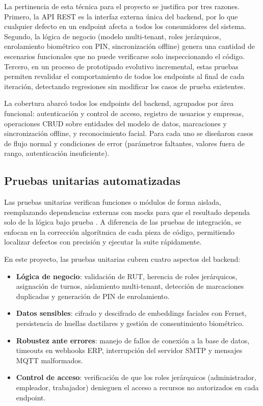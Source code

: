 \documentclass{iccmemoria}
\begin{document}
La pertinencia de esta técnica para el proyecto se justifica por tres razones. Primero, la API REST es la interfaz externa única del backend, por lo que cualquier defecto en un endpoint afecta a todos los consumidores del sistema. Segundo, la lógica de negocio (modelo multi-tenant, roles jerárquicos, enrolamiento biométrico con PIN, sincronización offline) genera una cantidad de escenarios funcionales que no puede verificarse solo inspeccionando el código. Tercero, en un proceso de prototipado evolutivo incremental, estas pruebas permiten revalidar el comportamiento de todos los endpoints al final de cada iteración, detectando regresiones sin modificar los casos de prueba existentes.

La cobertura abarcó todos los endpoints del backend, agrupados por área funcional: autenticación y control de acceso, registro de usuarios y empresas, operaciones CRUD sobre entidades del modelo de datos, marcaciones y sincronización offline, y reconocimiento facial. Para cada uno se diseñaron casos de flujo normal y condiciones de error (parámetros faltantes, valores fuera de rango, autenticación insuficiente).

\subsection{Pruebas unitarias automatizadas}
Las pruebas unitarias verifican funciones o módulos de forma aislada, reemplazando dependencias externas con mocks para que el resultado dependa solo de la lógica bajo prueba \cite{okken2021}. A diferencia de las pruebas de integración, se enfocan en la corrección algorítmica de cada pieza de código, permitiendo localizar defectos con precisión y ejecutar la suite rápidamente.

En este proyecto, las pruebas unitarias cubren cuatro aspectos del backend:
\begin{itemize}
    \item \textbf{Lógica de negocio}: validación de RUT, herencia de roles jerárquicos, asignación de turnos, aislamiento multi-tenant, detección de marcaciones duplicadas y generación de PIN de enrolamiento.
    \item \textbf{Datos sensibles}: cifrado y descifrado de embeddings faciales con Fernet, persistencia de huellas dactilares y gestión de consentimiento biométrico.
    \item \textbf{Robustez ante errores}: manejo de fallos de conexión a la base de datos, timeouts en webhooks ERP, interrupción del servidor SMTP y mensajes MQTT malformados.
    \item \textbf{Control de acceso}: verificación de que los roles jerárquicos (administrador, empleador, trabajador) denieguen el acceso a recursos no autorizados en cada endpoint.
\end{itemize}
\end{document}
